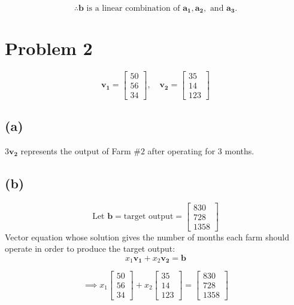 \documentclass[12pt, a4paper]{article}
\begin{document}
\[
\therefore \boldsymbol{b} \text{ is a linear combination of } \boldsymbol{a_1}, \boldsymbol{a_2}, \text{ and } \boldsymbol{a_3}.
\]
\newpage
\section*{Problem 2}

\[
\boldsymbol{v_1}  = \begin{bmatrix}
        50 \\
        56 \\
        34
    \end{bmatrix}, \quad
\boldsymbol{v_2}  = \begin{bmatrix}
       35 \\
        14 \\
       123
\end{bmatrix}
\]

\subsection*{(a)}
$3\boldsymbol{v_2}$ represents the output of Farm $\#2$ after operating for 3 months.

\subsection*{(b)}
\[
    \text{Let } \boldsymbol{b} = \text{target output}  = \begin{bmatrix}
        830 \\
        728 \\
        1358
    \end{bmatrix}
\]
Vector equation whose solution gives the number of months each farm should operate in order to produce the target output:
\[
    x_1\boldsymbol{v_1} + x_2\boldsymbol{v_2} = \boldsymbol{b}
\]

\[
    \implies x_1\begin{bmatrix}
        50 \\
        56 \\
        34
    \end{bmatrix} + x_2\begin{bmatrix}
         35 \\
          14 \\
         123
    \end{bmatrix} = \begin{bmatrix}
        830 \\
        728 \\
        1358
    \end{bmatrix}
\]
\newpage
\end{document}
